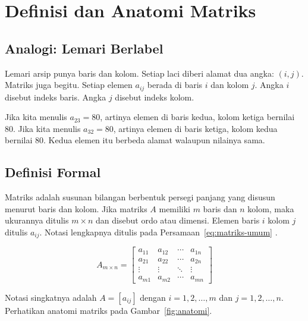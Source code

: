 \documentclass[11pt,a4paper]{article}
\begin{document}
\section{Definisi dan Anatomi Matriks}

\subsection{Analogi: Lemari Berlabel}

Lemari arsip punya baris dan kolom. Setiap laci diberi alamat dua angka: $(i,j)$. Matriks juga begitu. Setiap elemen $a_{ij}$ berada di baris $i$ dan kolom $j$. Angka $i$ disebut indeks baris. Angka $j$ disebut indeks kolom.

Jika kita menulis $a_{23}=80$, artinya elemen di baris kedua, kolom ketiga bernilai 80. Jika kita menulis $a_{32}=80$, artinya elemen di baris ketiga, kolom kedua bernilai 80. Kedua elemen itu berbeda alamat walaupun nilainya sama.

\subsection{Definisi Formal}

Matriks adalah susunan bilangan berbentuk persegi panjang yang disusun menurut baris dan kolom. Jika matriks $A$ memiliki $m$ baris dan $n$ kolom, maka ukurannya ditulis $m \times n$ dan disebut ordo atau dimensi. Elemen baris $i$ kolom $j$ ditulis $a_{ij}$. Notasi lengkapnya ditulis pada Persamaan~\ref{eq:matriks-umum} \cite{anton}.

\begin{equation}
	A_{m\times n}=\begin{bmatrix}
		a_{11} & a_{12} & \cdots & a_{1n} \\
		a_{21} & a_{22} & \cdots & a_{2n} \\
		\vdots & \vdots & \ddots & \vdots \\
		a_{m1} & a_{m2} & \cdots & a_{mn}
	\end{bmatrix}
	\label{eq:matriks-umum}
\end{equation}

Notasi singkatnya adalah $A=[a_{ij}]$ dengan $i=1,2,\ldots,m$ dan $j=1,2,\ldots,n$. Perhatikan anatomi matriks pada Gambar~\ref{fig:anatomi}.
\end{document}
